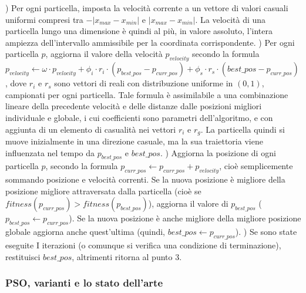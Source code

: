 \documentclass[12pt]{article}
\begin{document}
\tab {}) Per ogni particella, imposta la velocità corrente a un vettore di valori casuali uniformi compresi tra $-|x_{max} - x_{min}|$ e $|x_{max} - x_{min}|$. La velocità di una particella lungo una dimensione è quindi al più, in valore assoluto, l'intera ampiezza dell'intervallo ammissibile per la coordinata corrispondente. \newline
\tab {}) Per ogni particella $p$, aggiorna il valore della velocità $p_{velocity}$ secondo la formula \newline $p_{velocity}  \leftarrow \omega \cdot p_{velocity} + \phi_i \cdot r_i \cdot \left( p_{best\_pos} - p_{curr\_pos} \right) + \phi_s \cdot r_s \cdot \left( best\_pos - p_{curr\_pos} \right) $,\newline
dove $r_i $ e $r_s$ sono vettori di reali con distribuzione uniforme in $ \left( 0, 1 \right) $, campionati per ogni particella. Tale formula è assimilabile a una combinazione lineare della precedente velocità e delle distanze dalle posizioni migliori individuale e globale, i cui coefficienti sono parametri dell'algoritmo, e con aggiunta di un elemento di casualità nei vettori $r_i$ e $r_g$. La particella quindi si muove inizialmente in una direzione casuale, ma la sua traiettoria viene influenzata nel tempo da $p_{best\_pos}$ e $best\_pos$. \newline
\tab {}) Aggiorna la posizione di ogni particella $p$, secondo la formula \newline $p_{curr\_pos} \leftarrow p_{curr\_pos} + p_{velocity}$, cioè semplicemente sommando posizione e velocità correnti. Se la nuova posizione è migliore della posizione migliore attraversata dalla particella (cioè se $fitness(p_{curr\_pos}) >  fitness(p_{best\_pos})$), aggiorna il valore di $p_{best\_pos}$ ($p_{best\_pos} \leftarrow p_{curr\_pos}$). Se la nuova posizione è anche migliore della migliore posizione globale aggiorna anche quest'ultima (quindi, $best\_pos \leftarrow p_{curr\_pos}$). \newline
\tab {}) Se sono state eseguite I iterazioni (o comunque si verifica una condizione di terminazione), restituisci $best\_pos$, altrimenti ritorna al punto 3. \newline 
\newline

\subsubsection*{PSO, varianti e lo stato dell'arte}
\end{document}
